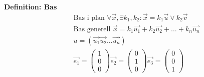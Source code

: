 \begin{multicols}{2}
\textbf{Definition: Bas}
\begin{align*}
  &\quad  \text{Bas i plan } \forall{\vec{x}},\exists{k_1,k_2}:
  \vec{x} = k_1\vec{u} \lor k_2\vec{v} \\
  &\quad  \text{Bas generell } \vec{x} = k_1\vec{u_1}+k_2\vec{u_2}+ \ldots +k_n\vec{u_n} \\
  &\quad \underline{u}=(\vec{u_1}\vec{u_2}\ldots\vec{u_n}) \\
  &\quad
  \vec{e_1}=\begin{pmatrix}  1 \\  0 \\  0  \end{pmatrix}
  \vec{e_2}=\begin{pmatrix}  0 \\  1 \\  0  \end{pmatrix}
  \vec{e_3}=\begin{pmatrix}  0 \\  0 \\  1  \end{pmatrix} \\
\end{align*}


\end{multicols}

